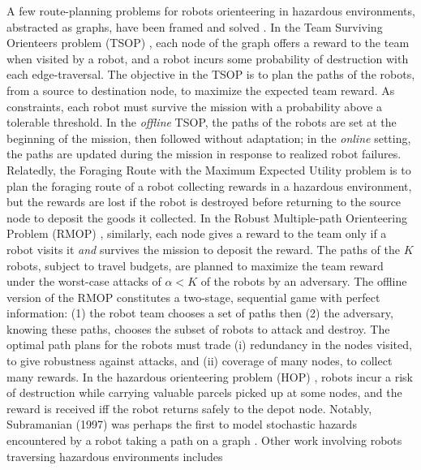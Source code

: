 \documentclass[fleqn,10pt,lineno]{wlpeerj}
\begin{document}
A few route-planning problems for robots orienteering in hazardous environments, abstracted as graphs, have been framed and solved \cite{zhou2021multi}. 
In the Team Surviving Orienteers problem (TSOP) \cite{jorgensen2018team,jorgensen2017matroid,jorgensen2024matroid}, each node of the graph offers a reward to the team when visited by a robot, and a robot incurs some probability of destruction with each edge-traversal.
The objective in the TSOP is to plan the paths of the robots, from a source to destination node, to maximize the expected team reward. As constraints, each robot must survive the mission with a probability above a tolerable threshold. 
In the \emph{offline} TSOP, the paths of the robots are set at the beginning of the mission, then followed without adaptation; in the \emph{online} setting, the paths are updated during the mission in response to realized robot failures.
Relatedly, the Foraging Route with the Maximum Expected Utility problem \cite{di2022foraging} is to plan the foraging route of a robot collecting rewards in a hazardous environment, but the rewards are lost if the robot is destroyed before returning to the source node to deposit the goods it collected.
In the Robust Multiple-path Orienteering Problem (RMOP) \cite{shi2023robust}, similarly, each node gives a reward to the team only if a robot visits it \emph{and} survives the mission to deposit the reward. The paths of the $K$ robots, subject to travel budgets, are planned to maximize the team reward under the worst-case attacks of $\alpha<K$ of the robots by an adversary. 
The offline version of the RMOP constitutes a two-stage, sequential game with perfect information: (1) the robot team chooses a set of paths then (2) the adversary, knowing these paths, chooses the subset of robots to attack and destroy. 
The optimal path plans for the robots must trade (i) redundancy in the nodes visited, to give robustness against attacks, and (ii) coverage of many nodes, to collect many rewards.
In the hazardous orienteering problem (HOP) \cite{santini2023hazardous,montemanni2025exact}, robots incur a risk of destruction while carrying valuable parcels picked up at some nodes, and the reward is received iff the robot returns safely to the depot node.
Notably, Subramanian (1997) was perhaps the first to model stochastic hazards encountered by a robot taking a path on a graph \cite{sherali1997low}.
Other work involving robots traversing hazardous environments includes 
\end{document}
